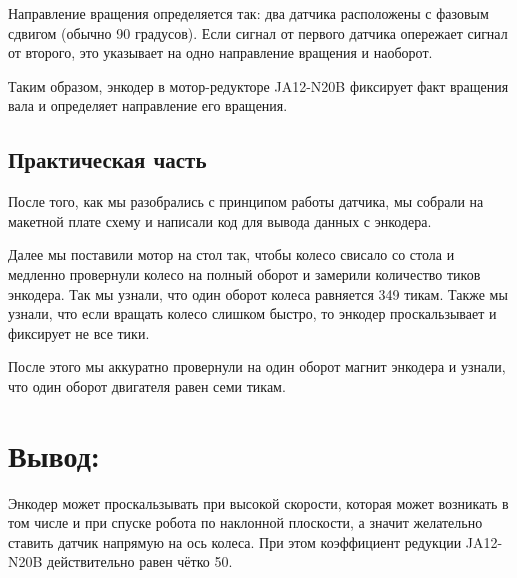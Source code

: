 Направление вращения определяется так: два датчика расположены с фазовым сдвигом (обычно 90 градусов). Если сигнал от первого датчика опережает сигнал от второго, это указывает на одно направление вращения и наоборот.

Таким образом, энкодер в мотор-редукторе JA12-N20B фиксирует факт вращения вала и определяет направление его вращения.

\subsection{Практическая часть}
После того, как мы разобрались с принципом работы датчика, мы собрали на макетной плате схему и написали код для вывода данных с энкодера.

Далее мы поставили мотор на стол так, чтобы колесо свисало со стола и медленно провернули колесо на полный оборот и замерили количество тиков энкодера. Так мы узнали, что один оборот колеса равняется 349 тикам. Также мы узнали, что если вращать колесо слишком быстро, то энкодер проскальзывает и фиксирует не все тики.

После этого мы аккуратно провернули на один оборот магнит энкодера и узнали, что один оборот двигателя равен семи тикам.

\section*{Вывод:}
Энкодер может проскальзывать при высокой скорости, которая может возникать в том числе и при спуске робота по наклонной плоскости, а значит желательно ставить датчик напрямую на ось колеса. При этом коэффициент редукции JA12-N20B действительно равен чётко 50.
